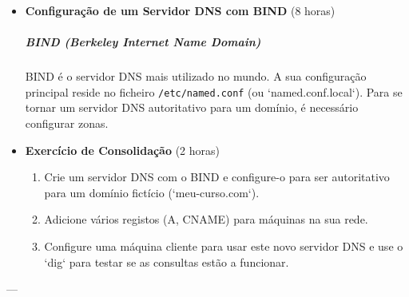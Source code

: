 \documentclass[10pt,a4paper]{article}
\begin{document}
\begin{itemize}
		\item \textbf{Configuração de um Servidor DNS com BIND} (8 horas)
		\subparagraph{BIND (Berkeley Internet Name Domain)} BIND é o servidor DNS mais utilizado no mundo. A sua configuração principal reside no ficheiro \texttt{/etc/named.conf} (ou `named.conf.local`). Para se tornar um servidor DNS autoritativo para um domínio, é necessário configurar zonas.
		
		\item \textbf{Exercício de Consolidação} (2 horas)
		\begin{enumerate}
			\item Crie um servidor DNS com o BIND e configure-o para ser autoritativo para um domínio fictício (`meu-curso.com`).
			\item Adicione vários registos (A, CNAME) para máquinas na sua rede.
			\item Configure uma máquina cliente para usar este novo servidor DNS e use o `dig` para testar se as consultas estão a funcionar.
		\end{enumerate}
	\end{itemize}
	
	---
	
\end{document}
